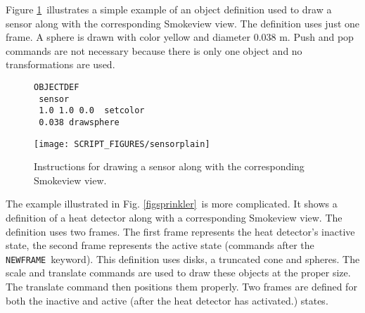 \documentclass[11pt,twoside]{book}
\newcommand{\figheightA}{2.5in}
\begin{document}
Figure \ref{figsensor}\ illustrates a simple example of an object definition
used to draw a sensor along with the corresponding Smokeview view.
The definition uses just one frame. A sphere is drawn with color
yellow and diameter 0.038 m. Push and pop commands are not necessary
because there is only one object and no transformations are used.

\begin{figure}[bph]
{\small
\begin{lstlisting}[frame=single,rulecolor=\color{yellow},
framerule=1pt,framesep=1pc,fillcolor=\color{yellow}]
OBJECTDEF
 sensor
 1.0 1.0 0.0  setcolor
 0.038 drawsphere
\end{lstlisting}
}
\begin{center}
\texttt{[image: SCRIPT\_FIGURES/sensorplain]}\\
\end{center}
\caption{Instructions for drawing a sensor along with the corresponding Smokeview view.}
\label{figsensor}%
\end{figure}

The example illustrated in Fig. \ref{figsprinkler}\ is more complicated.
It shows a definition of a heat detector along with a corresponding
Smokeview view. The definition uses two frames. The first frame represents
the heat detector's inactive state, the second frame represents the active
state (commands after the {\tt NEWFRAME}\ keyword). This definition uses
disks, a truncated cone and spheres. The scale and translate commands are
used to draw these objects at the proper size. The translate command then
positions them properly.  Two frames are defined for both the inactive and
active (after the heat detector has activated.) states.
\end{document}
